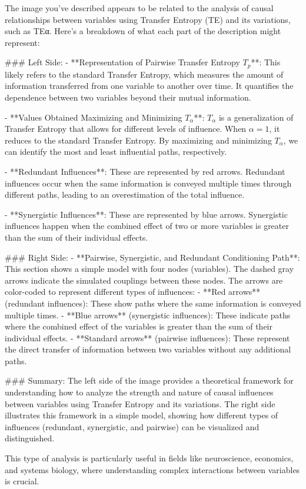 The image you've described appears to be related to the analysis of causal relationships between variables using Transfer Entropy (TE) and its variations, such as TEα. Here's a breakdown of what each part of the description might represent:

### Left Side:
- **Representation of Pairwise Transfer Entropy \( T_p \)**: This likely refers to the standard Transfer Entropy, which measures the amount of information transferred from one variable to another over time. It quantifies the dependence between two variables beyond their mutual information.
  
- **Values Obtained Maximizing and Minimizing \( T_\alpha \)**: \( T_\alpha \) is a generalization of Transfer Entropy that allows for different levels of influence. When \( \alpha = 1 \), it reduces to the standard Transfer Entropy. By maximizing and minimizing \( T_\alpha \), we can identify the most and least influential paths, respectively.

- **Redundant Influences**: These are represented by red arrows. Redundant influences occur when the same information is conveyed multiple times through different paths, leading to an overestimation of the total influence.

- **Synergistic Influences**: These are represented by blue arrows. Synergistic influences happen when the combined effect of two or more variables is greater than the sum of their individual effects.

### Right Side:
- **Pairwise, Synergistic, and Redundant Conditioning Path**: This section shows a simple model with four nodes (variables). The dashed gray arrows indicate the simulated couplings between these nodes. The arrows are color-coded to represent different types of influences:
  - **Red arrows** (redundant influences): These show paths where the same information is conveyed multiple times.
  - **Blue arrows** (synergistic influences): These indicate paths where the combined effect of the variables is greater than the sum of their individual effects.
  - **Standard arrows** (pairwise influences): These represent the direct transfer of information between two variables without any additional paths.

### Summary:
The left side of the image provides a theoretical framework for understanding how to analyze the strength and nature of causal influences between variables using Transfer Entropy and its variations. The right side illustrates this framework in a simple model, showing how different types of influences (redundant, synergistic, and pairwise) can be visualized and distinguished.

This type of analysis is particularly useful in fields like neuroscience, economics, and systems biology, where understanding complex interactions between variables is crucial.